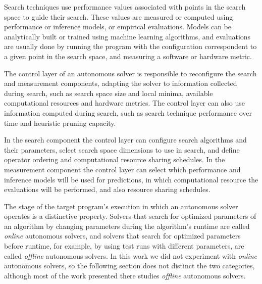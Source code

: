 Search techniques use performance values associated with points in the
search space to guide their search. These values are measured or computed
using performance or inference models, or empirical evaluations.
Models can be analytically built or trained using machine learning
algorithms, and evaluations are usually done by running the program
with the configuration correspondent to a given point in the search
space, and measuring a software or hardware metric.

The control layer of an autonomous solver is responsible to reconfigure the
search and measurement components, adapting the solver to information
collected during search, such as search space size and local minima, available
computational resources and hardware metrics. The control layer can also use
information computed during search, such as search technique performance over
time and heuristic pruning capacity.

In the search component the control layer can configure search algorithms and
their parameters, select search space dimensions to use in search, and define
operator ordering and computational resource sharing schedules.  In the
measurement component the control layer can select which performance and
inference models will be used for predictions, in which computational resource
the evaluations will be performed, and also resource sharing schedules.

The stage of the target program's execution in which an autonomous solver
operates is a distinctive property. Solvers that search for optimized
parameters of an algorithm by changing parameters during the algorithm's
runtime are called \textit{online} autonomous solvers, and solvers that search
for optimized parameters before runtime, for example, by using test runs with
different parameters, are called \textit{offline} autonomous solvers. In this
work we did not experiment with \textit{online} autonomous solvers, so the
following section does not distinct the two categories, although most of the
work presented there studies \textit{offline} autonomous solvers.


